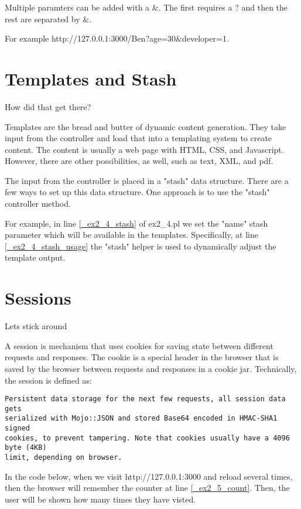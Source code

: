 \documentclass[14pt]{extreport}
\begin{document}
Multiple paramters can be added with a \&.  The first requires a ? and then the
rest are separated by \&.

For example http://127.0.0.1:3000/Ben?age=30\&developer=1.

\section{Templates and Stash}

{\Large How did that get there?}

Templates are the bread and butter of dynamic content generation.  They take
input from the controller and load that into a templating system to create
content.  The content is usually a web page with HTML, CSS, and Javascript.
However, there are other possibilities, as well, such as text, XML, and pdf.

The input from the controller is placed in a "stash" data structure.  There are
a few ways to set up this data structure.  One approach is to use the "stash"
controller method.



For example, in line \ref{_ex2_4_stash} of ex2\_4.pl we set the "name" stash 
parameter which will be available in the templates.  Specifically, at line 
\ref{_ex2_4_stash_usage} the "stash" helper is used to dynamically adjust
the template output.

\section{Sessions}

{\Large Lets stick around}

A session is mechanism that uses cookies for saving state between different
requests and responses.  The cookie is a special header in the browser that is
saved by the browser between requests and responses in a cookie jar.  Technically,
the session is defined as:

\begin{lstlisting}[style=BlockStyle]
Persistent data storage for the next few requests, all session data gets
serialized with Mojo::JSON and stored Base64 encoded in HMAC-SHA1 signed
cookies, to prevent tampering. Note that cookies usually have a 4096 byte (4KB)
limit, depending on browser.
\end{lstlisting}

In the code below, when we visit http://127.0.0.1:3000 and reload several
times, then the browser will remember the counter at line \ref{_ex2_5_count}.  
Then, the user will be shown how many times they have visted.
\end{document}
